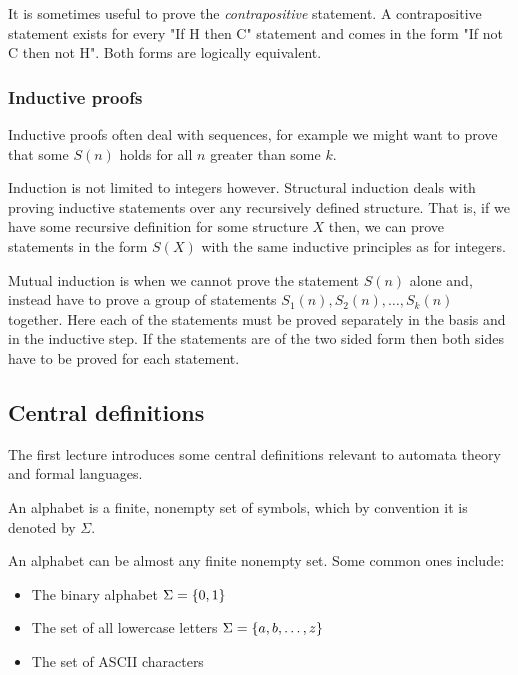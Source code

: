 It is sometimes useful to prove the \textit{contrapositive} statement. A contrapositive statement exists for every "If H then C" statement and comes in the form "If not C then not H". Both forms are logically equivalent.

\subsubsection{Inductive proofs}
Inductive proofs often deal with sequences, for example we might want to prove that some $S(n)$ holds for all $n$ greater than some $k$.

Induction is not limited to integers however. Structural induction deals with proving inductive statements over any recursively defined structure. That is, if we have some recursive definition for some structure $X$ then, we can prove statements in the form $S(X)$ with the same inductive principles as for integers.

Mutual induction is when we cannot prove the statement $S(n)$ alone and, instead have to prove a group of statements $S_1(n), S_2(n), \dots,S_k(n)$ together. Here each of the statements must be proved separately in the basis and in the inductive step. If the statements are of the two sided form then both sides have to be proved for each statement.

\subsection{Central definitions}
The first lecture introduces some central definitions relevant to automata theory and formal languages. \\

\begin{definition}[Alphabet] \label{def:alphabet}
    An alphabet is a finite, nonempty set of symbols, which by convention it is denoted by $\Sigma$.
\end{definition}
\begin{example}
    An alphabet can be almost any finite nonempty set. Some common ones include: 
    \begin{itemize}
        \item The binary alphabet $\Sigma = \left\{ 0,1 \right\}$
        \item The set of all lowercase letters $\Sigma = \left\{ a,b,\dots, z \right\}$
        \item The set of ASCII characters
    \end{itemize}
\end{example}

